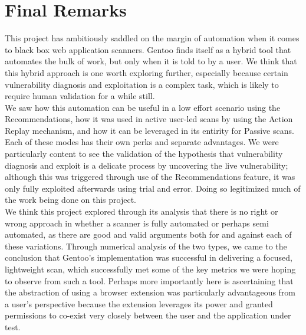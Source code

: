 \section{Final Remarks}


This project has ambitiously saddled on the margin of automation when it comes to black box web application scanners. Gentoo finds itself as a hybrid tool that automates the bulk of work, but only when it is told to by a user. We think that this hybrid approach is one worth exploring further, especially because certain vulnerability diagnosis and exploitation is a complex task, which is likely to require human validation for a while still. \\

We saw how this automation can be useful in a low effort scenario using the Recommendations, how it was used in active user-led scans by using the Action Replay mechanism, and how it can be leveraged in its entirity for Passive scans. Each of these modes has their own perks and separate advantages. We were particularly content to see the validation of the hypothesis that vulnerability diagnosis and exploit is a delicate process by uncovering the live vulnerability; although this was triggered through use of the Recommendations feature, it was only fully exploited afterwards using trial and error. Doing so legitimized much of the work being done on this project. \\

We think this project explored through its analysis that there is no right or wrong approach in whether a scanner is fully automated or perhaps semi automated, as there are good and valid arguments both for and against each of these variations. Through numerical analysis of the two types, we came to the conclusion that Gentoo's implementation was successful in delivering a focused, lightweight scan, which successfully met some of the key metrics we were hoping to observe from such a tool. Perhaps more importantly here is ascertaining that the abstraction of using a browser extension was particularly advantageous from a user's perspective because the extension leverages its power and granted permissions to co-exist very closely between the user and the application under test. \\

